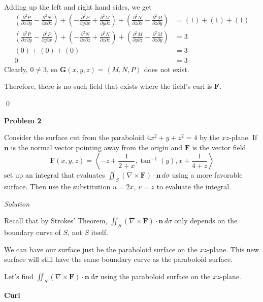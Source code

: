 \documentclass{article}
\newcommand{\lrp}[1]{\left( #1 \right)}
\newcommand{\lra}[1]{\left\langle #1 \right\rangle}
\newcommand{\F}[0]{\mathbf{F}}
\newcommand{\n}[0]{\mathbf{n}}
\newcommand{\Solution}{\textit{Solution}}
\begin{document}
Adding up the left and right hand sides, we get
\begin{align*}
    \lrp{\frac{\partial^2 P}{\partial x \partial y}- \frac{\partial ^2 N}{\partial x\partial z}}+\lrp{-\frac{\partial^2 P}{\partial y \partial x}+ \frac{\partial ^2 M}{\partial y\partial z}}+\lrp{\frac{\partial^2 N}{\partial z \partial x}- \frac{\partial ^2 M}{\partial z\partial y}}&=\lrp{1}+\lrp{1}+\lrp{1}\\
    \lrp{\frac{\partial ^2 P}{\partial x \partial y}-\frac{\partial ^2 P}{\partial y \partial x}}+\lrp{-\frac{\partial^2 N}{\partial x\partial z}+\frac{\partial^2 N}{\partial z\partial x}}+\lrp{\frac{\partial ^2 M}{\partial y\partial z}-\frac{\partial^2 M}{\partial z\partial y}}&=3\tag{rearrange}\\
    \lrp{0}+\lrp{0}+\lrp{0}&=3\tag{mixed second 
    partial derivatives are equal}\\
    0&=3
\end{align*}
Clearly, $0\neq 3$, so $\mathbf{G}(x,y,z)=\lra{M,N,P}$ does not exist.

Therefore, there is no such field that exists where the field's curl is $\F$.

\qed

{}\textbf{Problem 2}

Consider the surface cut from the paraboloid $4x^2+y+z^2=4$ by the $xz$-plane. If $\n$ is the normal vector pointing away from the origin and $\F$ is the vector field
\begin{equation*}
    \F(x,y,z)=\lra{-z+\frac{1}{2+x},\tan^{-1}(y),x+\frac{1}{4+z}}
\end{equation*}
set up an integral that evaluates $\displaystyle \iint_S\lrp{\nabla \times \F}\cdot \n\,d\sigma$ using a more favorable surface. Then use the substitution $u=2x$, $v=z$ to evaluate the integral.

\Solution

Recall that by Strokes' Theorem, $\displaystyle \iint_S \lrp{\nabla \times \F}\cdot\n\,d\sigma$ only depends on the boundary curve of $S$, not $S$ itself.

We can have our surface just be the paraboloid surface on the $xz$-plane. This new surface will still have the same boundary curve as the paraboloid surface.

Let's find $\displaystyle \iint_S \lrp{\nabla \times \F}\cdot\n\,d\sigma$ using the paraboloid surface on the $xz$-plane.

{}\textbf{Curl}
\end{document}
